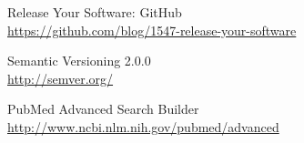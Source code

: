  Release Your Software: GitHub \\
\url{https://github.com/blog/1547-release-your-software}

 Semantic Versioning 2.0.0 \\
\url{http://semver.org/}

 PubMed Advanced Search Builder \\
\url{http://www.ncbi.nlm.nih.gov/pubmed/advanced}